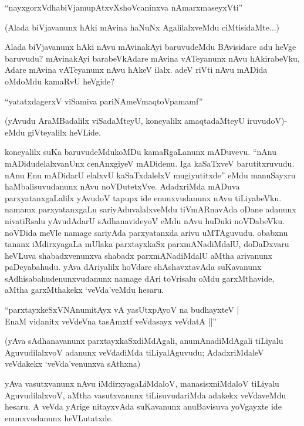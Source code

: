 \begin{shloka}
``nayxgorxVdhabiVjamupAtxvXshoVcaninxva nAmarxmaseyxVti''
\end{shloka}

(Alada biVjavanunx hAki mAvina haNuNx AgalilalxveMdu ciMtisidaMte$\ldots$)

Alada biVjavanunx hAki nAvu mAvinakAyi baruvudeMdu BAvisidare adu heVge baruvudu? mAvinakAyi barabeVkAdare mAvina vATeyanunx nAvu hAkirabeVku, Adare mAvina vATeyanunx nAvu hAkeV ilalx. adeV riVti nAvu mADida oMdoMdu kamaRvU heVgide?

\begin{shloka}
``yatatxdagerxV viSamiva pariNAmeV\s maqtoVpamamf''
\end{shloka}

(yAvudu AraMBadalilx viSadaMteyU, koneyalilx amaqtadaMteyU iruvudoV)-eMdu giVteyalilx heVLide.

koneyalilx suKa baruvudeMdukoMDu kamaRgaLanunx mADuvevu. ``nAnu mADidudelalxvanUnx cenAnxgiyeV mADidenu. Iga kaSaTxveV barutitxruvudu. nAnu Enu mADidarU elalxvU kaSaTxdalelxV mugiyutitxde'' eMdu manuSayxru haMbalisuvudanunx nAvu noVDutetxVve. AdadxriMda mADuva parxyatanxgaLalilx yAvudoV tapupx ide enunxvudanunx nAvu tiLiyabeVku. namamx parxyatanxgaLu sariyAduvalalxveMdu tiVmARnavAda oDane adanunx nivatiRsalu yAvudAdarU sAdhanavideyoV eMdu nAvu huDuki noVDabeVku. noVDida meVle namage sariyAda parxyatanxda arivu uMTAguvudu. obabxnu tananx iMdirxyagaLa mUlaka parxtayxkaSx parxmANadiMdalU, doDaDxvaru heVLuva shabadxvenunxva shabadx parxmANadiMdalU aMtha arivanunx paDeyabahudu. yAva dAriyalilx hoVdare shAshavxtavAda suKavanunx sAdhisabahudenunxvudanunx namage dAri toVrisalu oMdu garxMthavide, aMtha garxMthakekx `veVda'veMdu hesaru.

\begin{shloka}
``parxtayxkeSxVNAnumitAyx vA yasUtxpAyoV na budhayxteV |\\
EnaM vidanitx veVdeVna tasAmxtf veVdasayx veVdatA ||''
\end{shloka}

(yAva sAdhanavanunx parxtayxkaSxdiMdAgali, anumAnadiMdAgali tiLiyalu AguvudilalxvoV adanunx veVdadiMda tiLiyalAguvudu; AdadxriMdaleV veVdakekx `veVda'venunxva sAthxna)

yAva vasutxvanunx nAvu iMdirxyagaLiMdaloV, manasisxniMdaloV tiLiyalu AguvudilalxvoV, aMtha vasutxvanunx tiLisuvudariMda adakekx veVdaveMdu hesaru. A veVda yArige nitayxvAda suKavanunx anuBavisuva yoVgayxte ide enunxvudanunx heVLutatxde.

